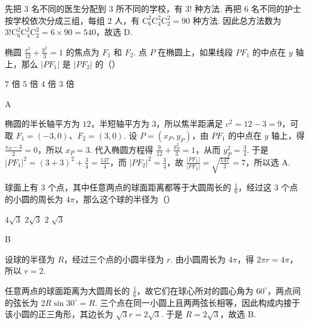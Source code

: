\begin{solution}
先把 \(3\) 名不同的医生分配到 \(3\) 所不同的学校，有 \(3!\) 种方法. 再把 \(6\) 名不同的护士按学校依次分成三组，每组 \(2\) 人，有
\(\mathrm C_{6}^{2}\mathrm C_{4}^{2}\mathrm C_{2}^{2}=90\) 种方法. 因此总方法数为
\(3!\mathrm C_{6}^{2}\mathrm C_{4}^{2}\mathrm C_{2}^{2}=6\times90=540\)，故选 D.
\end{solution}

\begin{problem}
椭圆 \(\frac{x^2}{12} + \frac{y^2}{3} = 1\) 的焦点为 \(F_{1}\) 和 \(F_{2}\). 点 \(P\) 在椭圆上，如果线段 \(PF_{1}\) 的中点在 \(y\) 轴上，那么 \(|PF_{1}|\) 是 \(|PF_{2}|\) 的（\quad）

\choices
    {\(7\) 倍}
    {\(5\) 倍}
    {\(4\) 倍}
    {\(3\) 倍}
\end{problem}

\begin{answer}
A
\end{answer}

\begin{solution}
椭圆的半长轴平方为 \(12\)，半短轴平方为 \(3\)，所以焦半距满足 \(c^{2}=12-3=9\)，可取 \(F_{1}=(-3,0)\)、\(F_{2}=(3,0)\). 设 \(P=(x_{P},y_{P})\)，由 \(PF_{1}\) 的中点在 \(y\) 轴上，得
\(\frac{x_{P}-3}{2}=0\)，所以 \(x_{P}=3\). 代入椭圆方程得
\(\frac{9}{12}+\frac{y_{P}^{2}}{3}=1\)，从而 \(y_{P}^{2}=\frac{3}{4}\). 于是
\(|PF_{1}|^{2}=(3+3)^{2}+\frac{3}{4}=\frac{147}{4}\)，而 \(|PF_{2}|^{2}=\frac{3}{4}\)，故
\(\frac{|PF_{1}|}{|PF_{2}|}=\sqrt{\frac{147}{3}}=7\)，所以选 A.
\end{solution}

\begin{problem}
球面上有 \(3\) 个点，其中任意两点的球面距离都等于大圆周长的 \(\frac{1}{6}\)，经过这 \(3\) 个点的小圆的周长为 \(4\pi\)，那么这个球的半径为（\quad）

\choices
    {\(4\sqrt{3}\)}
    {\(2\sqrt{3}\)}
    {\(2\)}
    {\(\sqrt{3}\)}
\end{problem}

\begin{answer}
B
\end{answer}

\begin{solution}
设球的半径为 \(R\)，经过三个点的小圆半径为 \(r\). 由小圆周长为 \(4\pi\)，得 \(2\pi r=4\pi\)，所以 \(r=2\).

任意两点的球面距离为大圆周长的 \(\frac{1}{6}\)，故它们在球心所对的圆心角为 \(60^{\circ}\)，两点间的弦长为
\(2R\sin30^{\circ}=R\). 三个点在同一小圆上且两两弦长相等，因此构成内接于该小圆的正三角形，其边长为 \(\sqrt{3}r=2\sqrt{3}\). 于是 \(R=2\sqrt{3}\)，故选 B.
\end{solution}

